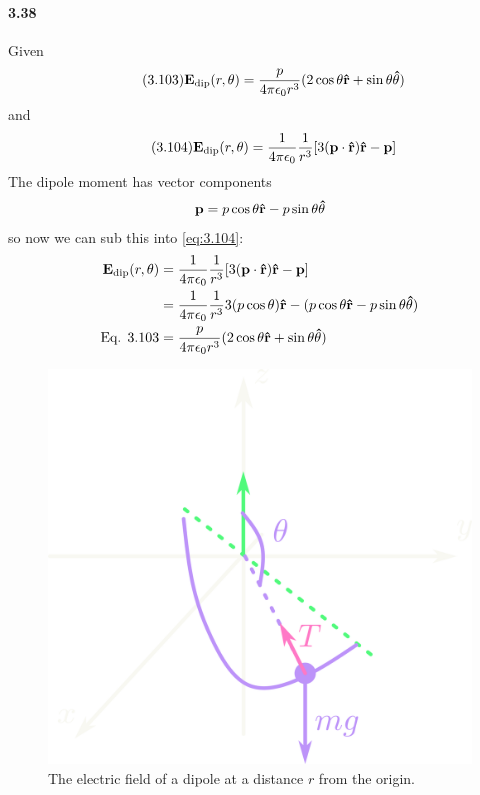 \documentclass[../main.tex]{subfiles}
\begin{document}
\paragraph{3.38} Given
\begin{align*}\tag{3.103} \label{eq:3.103}
    \vb E_\text{dip} (r,\theta) = \frac{p}{4\pi\epsilon_0 r^3} (2\cos\theta \vu{r} + \sin\theta \vu{\theta})
\end{align*}
and
\begin{align*}\tag{3.104} \label{eq:3.104}
    \vb E_\text{dip} (r,\theta) = \frac{1}{4\pi\epsilon_0} \frac{1}{r^3} [3(\vb p \cdot \vu r) \vu r - \vb p]
\end{align*}
The dipole moment has vector components
\begin{align*}
    \vb p = p \cos\theta \vu r - p \sin\theta \vu\theta
\end{align*}
so now we can sub this into \eqref{eq:3.104}:
\begin{align*}
    \vb E_\text{dip} (r,\theta) &= \frac{1}{4\pi\epsilon_0} \frac{1}{r^3} [3(\vb p \cdot \vu r) \vu r - \vb p] \\
    &= \frac{1}{4\pi\epsilon_0} \frac{1}{r^3} 3(p \cos\theta) \vu r - (p \cos\theta \vu r - p \sin\theta \vu\theta) \\
    \textrm{Eq. 3.103} &= \frac{p}{4\pi \epsilon_0 r^3} (2 \cos\theta \vu r + \sin\theta \vu\theta)
\end{align*}

\newpage
\begin{figure}[ht]
    \centering
    \includegraphics[width=0.5\linewidth]{hw4.png}
    \caption{The electric field of a dipole at a distance $r$ from the origin.}
    \label{fig:hw5_3_38}
\end{figure}
\end{document}
